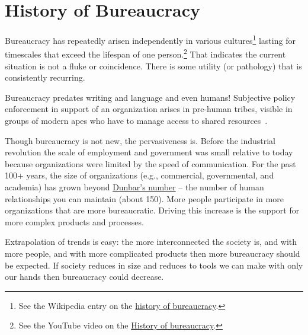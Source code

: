 \section{History of Bureaucracy\label{sec:history}}


Bureaucracy has repeatedly arisen independently in various cultures\footnote{See the Wikipedia entry on the \href{https://en.wikipedia.org/wiki/Bureaucracy\%23History}{history of bureaucracy}.%
}
lasting for timescales that exceed the lifespan of one person.\footnote{See the YouTube video on the \href{https://www.youtube.com/watch?v=B_nsZlcC12g}{History of bureaucracy}.} That indicates the current situation is not a fluke or coincidence. There is some utility (or pathology) that is consistently recurring. 


Bureaucracy predates writing and language and even humans! Subjective policy enforcement in support of an organization arises in pre-human tribes, visible in groups of modern apes who have to manage access to shared resources~\cite{2016_Suchak}. 



Though bureaucracy is not new, the pervasiveness is. Before the industrial revolution the scale of employment and government was small relative to today because organizations were limited by the speed of communication. For the past 100+ years, the size of organizations (e.g., commercial, governmental, and academia) has grown beyond \href{https://en.wikipedia.org/wiki/Dunbar\%27s_number}{Dunbar's number} -- the number of human relationships you can maintain (about 150). \iftoggle{WPinmargin}{\marginpar{$>$Wikipedia: Dunbar's number}}{}
More people participate in more organizations that are more bureaucratic. Driving this increase is the support for more complex products and processes. 


Extrapolation of trends is easy: the more interconnected the society is, and with more people, and with more complicated products then more bureaucracy should be expected. If society reduces in size and reduces to tools we can make with only our hands then bureaucracy could decrease. 
